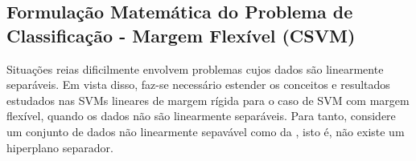 \documentclass[12pt,a4paper]{scrartcl}
\theoremstyle{definition}%
\begin{document}

\subsection{Formulação Matemática do Problema de Classificação - Margem Flexível (CSVM)}

Situações reias dificilmente envolvem problemas cujos dados são linearmente separáveis. Em vista disso, faz-se necessário estender os conceitos e resultados estudados nas SVMs lineares de margem rígida para o caso de SVM com margem flexível, quando os dados não são linearmente separáveis. Para tanto, considere um conjunto de dados não linearmente sepavável como da , isto é, não existe um hiperplano separador. 
\end{document}
